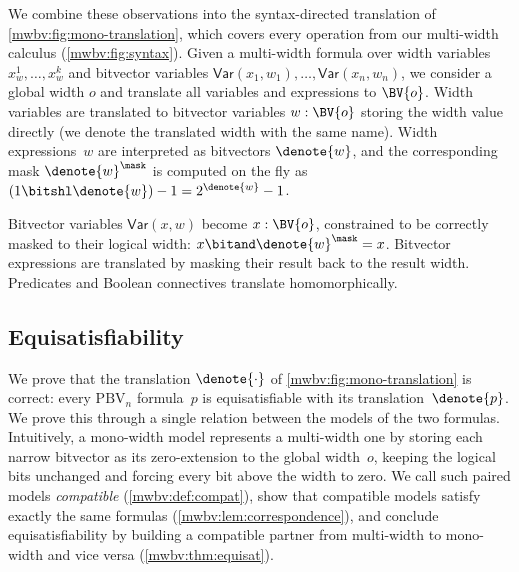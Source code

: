 
We combine these observations into the syntax-directed translation
of \cref{mwbv:fig:mono-translation}, which covers every operation
from our multi-width calculus (\cref{mwbv:fig:syntax}).
Given a multi-width formula over width variables $x_w^1, \ldots, x_w^k$ and bitvector variables
$\textsf{Var}(x_1, w_1), \ldots, \textsf{Var}(x_n, w_n)$,
we consider a global width $o$ and translate all variables and expressions to $\BV{o}$.
Width variables are translated to bitvector variables $w : \BV{o}$ storing the
width value directly (we denote the translated width with the same name).
%
Width expressions~$w$ are interpreted as bitvectors $\denote{w}$, and the
corresponding mask $\denote{w}^\mask$ is computed on the fly as
$(1 \bitshl \denote{w}) - 1 = 2^{\denote{w}} - 1$.

Bitvector variables $\textsf{Var}(x, w)$ become $x : \BV{o}$, constrained to be
correctly masked to their logical width: $x \bitand \denote{w}^\mask = x$.
%
Bitvector expressions are translated by masking their result back to the result
width. Predicates and Boolean connectives translate homomorphically.


\subsection{Equisatisfiability}\label{mwbv:sec:bounded-proof}

We prove that the translation $\denote{\cdot}$ of \cref{mwbv:fig:mono-translation} is correct:
every $\text{PBV}_n$ formula~$p$ is equisatisfiable with its
translation~$\denote{p}$. We prove this through a single relation between the
models of the two formulas. Intuitively, a mono-width model represents a
multi-width one by storing each narrow bitvector as its zero-extension to the
global width~$o$, keeping the logical bits unchanged and forcing every bit above
the width to zero. We call such paired models \emph{compatible}
(\cref{mwbv:def:compat}), show that compatible models satisfy exactly the same
formulas (\cref{mwbv:lem:correspondence}), and conclude equisatisfiability by
building a compatible partner from multi-width to mono-width and vice versa (\cref{mwbv:thm:equisat}).

